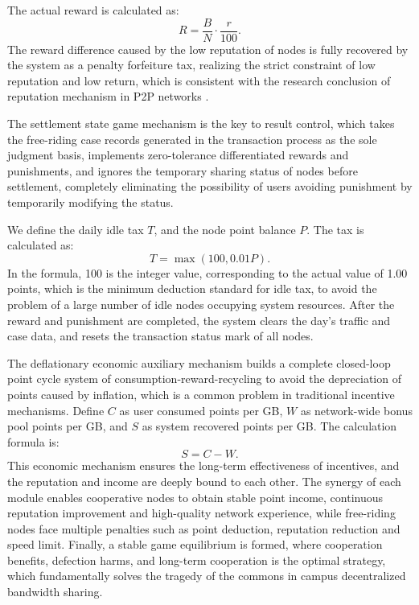 \documentclass[conference,letterpaper]{IEEEtran}
\begin{document}
The actual reward is calculated as:
\begin{equation}
  R = \frac{B}{N} \cdot \frac{r}{100}.
  \label{eq:reward}
\end{equation}
The reward difference caused by the low reputation of nodes is fully recovered by the system as a penalty forfeiture tax, realizing the strict constraint of low reputation and low return, which is consistent with the research conclusion of reputation mechanism in P2P networks \cite{buchegger2002}.

The settlement state game mechanism is the key to result control, which takes the free-riding case records generated in the transaction process as the sole judgment basis, implements zero-tolerance differentiated rewards and punishments, and ignores the temporary sharing status of nodes before settlement, completely eliminating the possibility of users avoiding punishment by temporarily modifying the status.

We define the daily idle tax $T$, and the node point balance $P$. The tax is calculated as:
\begin{equation}
  T = \max(100, 0.01P).
  \label{eq:tax}
\end{equation}
In the formula, 100 is the integer value, corresponding to the actual value of 1.00 points, which is the minimum deduction standard for idle tax, to avoid the problem of a large number of idle nodes occupying system resources. After the reward and punishment are completed, the system clears the day's traffic and case data, and resets the transaction status mark of all nodes.

The deflationary economic auxiliary mechanism builds a complete closed-loop point cycle system of consumption-reward-recycling to avoid the depreciation of points caused by inflation, which is a common problem in traditional incentive mechanisms. Define $C$ as user consumed points per GB, $W$ as network-wide bonus pool points per GB, and $S$ as system recovered points per GB. The calculation formula is:
\begin{equation}
  S = C - W.
  \label{eq:recovered}
\end{equation}
This economic mechanism ensures the long-term effectiveness of incentives, and the reputation and income are deeply bound to each other. The synergy of each module enables cooperative nodes to obtain stable point income, continuous reputation improvement and high-quality network experience, while free-riding nodes face multiple penalties such as point deduction, reputation reduction and speed limit. Finally, a stable game equilibrium is formed, where cooperation benefits, defection harms, and long-term cooperation is the optimal strategy, which fundamentally solves the tragedy of the commons in campus decentralized bandwidth sharing.
\end{document}
